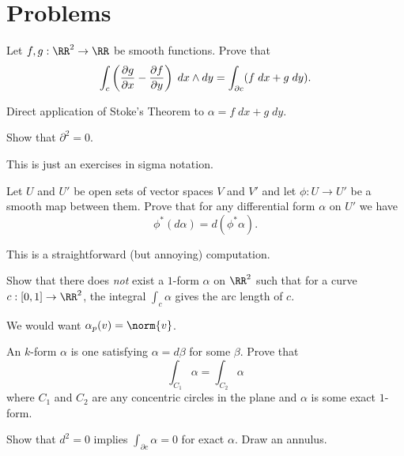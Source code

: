 \documentclass[11pt]{scrreprt}
\begin{document}
\section{Problems}
\begin{dproblem}
	Let $f,g : \RR^2 \to \RR$ be smooth functions.
	Prove that
	\[ \int_c \left( \frac{\partial g}{\partial x} - \frac{\partial f}{\partial y} \right) \; dx \wedge dy
	= \int_{\partial c} (f \; dx + g \; dy). \]
	\begin{hint}
		Direct application of Stoke's Theorem to $\alpha = f \; dx + g \; dy$.
	\end{hint}
\end{dproblem}

\begin{problem}
	Show that $\partial^2 = 0$.
	\begin{hint}
		This is just an exercises in sigma notation.
	\end{hint}
\end{problem}

\begin{problem}
	Let $U$ and $U'$ be open sets of vector spaces $V$ and $V'$
	and let $\phi : U \to U'$ be a smooth map between them.
	Prove that for any differential form $\alpha$ on $U'$ we have
	\[ \phi^\ast(d\alpha) = d(\phi^\ast\alpha). \]
	\begin{hint}
		This is a straightforward (but annoying) computation.
	\end{hint}
\end{problem}

\begin{problem}
	Show that there does \emph{not} exist a $1$-form $\alpha$ on $\RR^2$ such that
	for a curve $c : [0,1] \to \RR^2$,
	the integral $\int_c \alpha$ gives the arc length of $c$.
	\begin{hint}
		We would want $\alpha_p(v) = \norm{v}$.
	\end{hint}
\end{problem}

\begin{problem}
	\gim
	An  $k$-form $\alpha$ is one satisfying $\alpha = d\beta$ for some $\beta$.
	Prove that
	\[ \int_{C_1} \alpha = \int_{C_2} \alpha \]
	where $C_1$ and $C_2$ are any concentric circles in the plane
	and $\alpha$ is some exact $1$-form.
	\begin{hint}
		Show that $d^2=0$ implies $\int_{\partial c} \alpha = 0$ for exact $\alpha$.
		Draw an annulus.
	\end{hint}
\end{problem}
\end{document}
